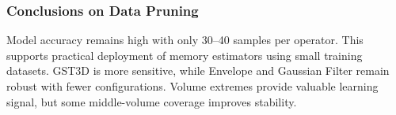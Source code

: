 \subsubsection{Conclusions on Data Pruning}
\label{subsec:data-reduction-conclusions}

Model accuracy remains high with only 30--40 samples per operator.
This supports practical deployment of memory estimators using small training datasets.
\ac{GST3D} is more sensitive, while Envelope and Gaussian Filter remain robust with fewer configurations.
Volume extremes provide valuable learning signal, but some middle-volume coverage improves stability.